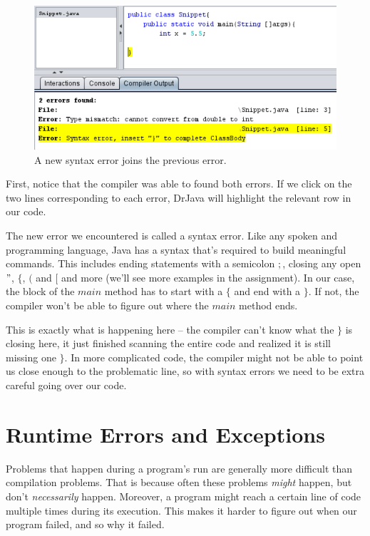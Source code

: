 \begin{figure}[h!]
\centering
\includegraphics[scale=0.8]{images/syntax_error.PNG}
\caption{A new syntax error joins the previous error.}
\label{fig:syntax_error}
\end{figure}

First, notice that the compiler was able to found both errors. If we click on the two lines corresponding to each error, DrJava will highlight the relevant row in our code. 

The new error we encountered is called a syntax error. Like any spoken and programming language, Java has a syntax that's required to build meaningful commands. This includes ending statements with a semicolon $;$, closing any open $"$, $\{$, $($ and $[$ and more (we'll see more examples in the assignment). In our case, the block of the $main$ method has to start with a $\{$ and end with a $\}$. If not, the compiler won't be able to figure out where the $main$ method ends.

This is exactly what is happening here -- the compiler can't know what the $\}$ is closing here, it just finished scanning the entire code and realized it is still missing one $\}$. In more complicated code, the compiler might not be able to point us close enough to the problematic line, so with syntax errors we need to be extra careful going over our code.

\section{Runtime Errors and Exceptions}

Problems that happen during a program's run are generally more difficult than compilation problems. That is because often these problems \emph{might} happen, but don't \emph{necessarily} happen. Moreover, a program might reach a certain line of code multiple times during its execution. This makes it harder to figure out when our program failed, and so why it failed.

